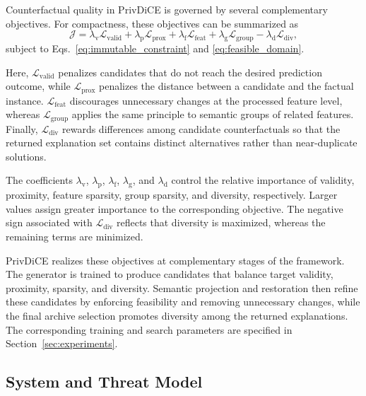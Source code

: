 \documentclass[preprint,12pt]{elsarticle}
\begin{document}
Counterfactual quality in PrivDiCE is governed by several complementary
objectives. For compactness, these objectives can be summarized as
\begin{equation}
\mathcal{J}
=
\lambda_{\mathrm{v}}\mathcal{L}_{\mathrm{valid}}
+
\lambda_{\mathrm{p}}\mathcal{L}_{\mathrm{prox}}
+
\lambda_{\mathrm{f}}\mathcal{L}_{\mathrm{feat}}
+
\lambda_{\mathrm{g}}\mathcal{L}_{\mathrm{group}}
-
\lambda_{\mathrm{d}}\mathcal{L}_{\mathrm{div}},
\label{eq:overall_cfe_objective}
\end{equation}
subject to Eqs.~\eqref{eq:immutable_constraint} and
\eqref{eq:feasible_domain}.

Here, $\mathcal{L}_{\mathrm{valid}}$ penalizes candidates that do not reach the
desired prediction outcome, while $\mathcal{L}_{\mathrm{prox}}$ penalizes the
distance between a candidate and the factual instance.
$\mathcal{L}_{\mathrm{feat}}$ discourages unnecessary changes at the processed
feature level, whereas $\mathcal{L}_{\mathrm{group}}$ applies the same
principle to semantic groups of related features. Finally,
$\mathcal{L}_{\mathrm{div}}$ rewards differences among candidate
counterfactuals so that the returned explanation set contains distinct
alternatives rather than near-duplicate solutions.

The coefficients
$\lambda_{\mathrm{v}}$, $\lambda_{\mathrm{p}}$, $\lambda_{\mathrm{f}}$,
$\lambda_{\mathrm{g}}$, and $\lambda_{\mathrm{d}}$ control the relative
importance of validity, proximity, feature sparsity, group sparsity, and
diversity, respectively. Larger values assign greater importance to the
corresponding objective. The negative sign associated with
$\mathcal{L}_{\mathrm{div}}$ reflects that diversity is maximized, whereas the
remaining terms are minimized.

PrivDiCE realizes these objectives at complementary stages of the framework.
The generator is trained to produce candidates that balance target validity,
proximity, sparsity, and diversity. Semantic projection and restoration then
refine these candidates by enforcing feasibility and removing unnecessary
changes, while the final archive selection promotes diversity among the
returned explanations. The corresponding training and search parameters are
specified in Section~\ref{sec:experiments}.


\subsection{System and Threat Model}
\label{subsec:system_model}
\end{document}
